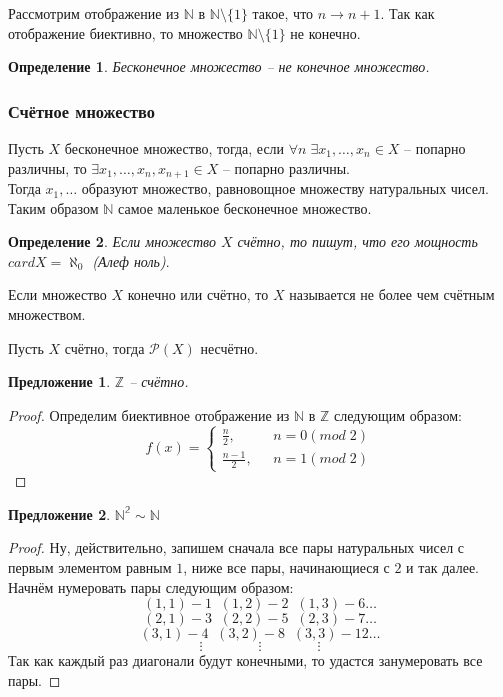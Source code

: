 \documentclass{article}
\newtheorem{Proposition}{Предложение}[section]
\newtheorem{Definition}{Определение}[section]
\begin{document}
Рассмотрим отображение из $\mathbb{N}$ в $\mathbb{N}\setminus\{1\}$ такое, что $n \rightarrow n+1.$ Так как отображение биективно, то множество $\mathbb{N}\setminus\{1\}$ не конечно.
\begin{Definition}
Бесконечное множество -- не конечное множество.
\end{Definition}

\subsubsection{Счётное множество}
Пусть $X$ бесконечное множество, тогда, если $\forall n \; \exists x_1,\ldots, x_n \in X$ -- попарно различны, то $\exists x_1,\ldots, x_n, x_{n+1} \in X$ -- попарно различны.\\

Тогда $x_1,\ldots$ образуют множество, равновощное множеству натуральных чисел. Таким образом $\mathbb{N}$ самое маленькое бесконечное множество.

\begin{Definition}
Если множество $X$ счётно, то пишут, что его мощность $cardX=\aleph_0$ (\textit{Алеф ноль})$.$
\end{Definition}

Если множество $X$ конечно или счётно, то $X$ называется не более чем счётным множеством.

Пусть $X$ счётно, тогда $\mathcal{P}(X)$ несчётно.\\

\begin{Proposition}
$\mathbb{Z}$ -- счётно.
\end{Proposition}
\begin{proof}
Определим биективное отображение из $\mathbb{N}$ в $\mathbb{Z}$ следующим образом: 
\begin{equation*}
f(x) = 
 \begin{cases}
   \frac{n}{2}, &\text{ $n = 0(mod \; 2) $}\\
   \frac{n-1}{2}, &\text{ $n = 1(mod \; 2)$}
 \end{cases}
\end{equation*}
\end{proof}

\begin{Proposition}
$\mathbb{N^2}\sim\mathbb{N}$ 
\end{Proposition}
\begin{proof}
Ну, действительно, запишем сначала все пары натуральных чисел с первым элементом равным $1$, ниже все пары, начинающиеся с $2$ и так далее. Начнём нумеровать пары следующим образом:
$$(1,1) - 1 \;\; (1,2) - 2 \;\; (1,3) - 6 \ldots$$
$$(2,1) - 3 \;\; (2,2) - 5 \;\; (2,3) - 7 \ldots$$
$$(3,1) - 4 \;\; (3,2) - 8 \;\; (3,3) - 12 \ldots$$
$$\vdots \quad\quad\quad\quad\vdots \quad\quad\quad\quad\vdots$$
Так как каждый раз диагонали будут конечными, то удастся занумеровать все пары.
\end{proof}
\end{document}
